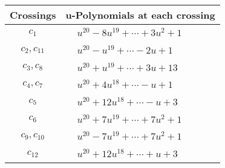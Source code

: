 \documentclass[1p]{elsarticle_modified}
\theoremstyle{definition}
\begin{document}
\begin{tabular}{m{50pt}|m{274pt}}
Crossings & \hspace{64pt}u-Polynomials at each crossing \\
\hline $$\begin{aligned}c_{1}\end{aligned}$$&$\begin{aligned}
&u^{20}-8 u^{19}+\cdots+3 u^2+1
\end{aligned}$\\
\hline $$\begin{aligned}c_{2},c_{11}\end{aligned}$$&$\begin{aligned}
&u^{20}- u^{19}+\cdots-2 u+1
\end{aligned}$\\
\hline $$\begin{aligned}c_{3},c_{8}\end{aligned}$$&$\begin{aligned}
&u^{20}+u^{19}+\cdots+3 u+13
\end{aligned}$\\
\hline $$\begin{aligned}c_{4},c_{7}\end{aligned}$$&$\begin{aligned}
&u^{20}+4 u^{18}+\cdots- u+1
\end{aligned}$\\
\hline $$\begin{aligned}c_{5}\end{aligned}$$&$\begin{aligned}
&u^{20}+12 u^{18}+\cdots- u+3
\end{aligned}$\\
\hline $$\begin{aligned}c_{6}\end{aligned}$$&$\begin{aligned}
&u^{20}+7 u^{19}+\cdots+7 u^2+1
\end{aligned}$\\
\hline $$\begin{aligned}c_{9},c_{10}\end{aligned}$$&$\begin{aligned}
&u^{20}-7 u^{19}+\cdots+7 u^2+1
\end{aligned}$\\
\hline $$\begin{aligned}c_{12}\end{aligned}$$&$\begin{aligned}
&u^{20}+12 u^{18}+\cdots+u+3
\end{aligned}$\\
\hline
\end{tabular}\\~\\
\end{document}
